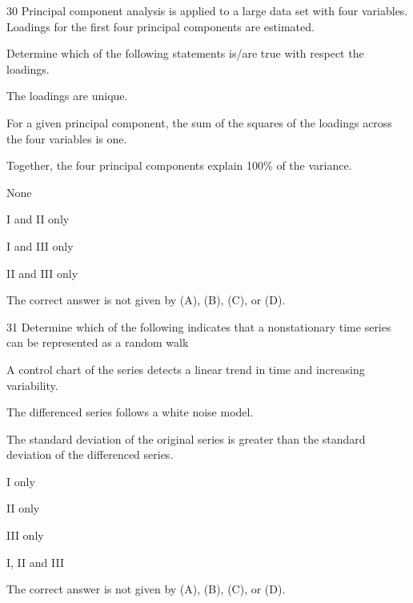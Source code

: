 \begin{question}{30}
Principal component analysis is applied to a large data set with four variables. Loadings for the first four principal components are estimated.

Determine which of the following statements is/are true with respect the loadings.
\begin{statements}
\item The loadings are unique.
\item For a given principal component, the sum of the squares of the loadings across the four variables is one.
\item Together, the four principal components explain 100\% of the variance.
\end{statements}

\begin{choices}
\item None
\item I and II only
\item I and III only
\item II and III only
\item The correct answer is not given by (A), (B), (C), or (D).
\end{choices}
\end{question}
\begin{question}{31}
Determine which of the following indicates that a nonstationary time series can be represented as a random walk
\begin{statements}
\item A control chart of the series detects a linear trend in time and increasing variability.
\item The differenced series follows a white noise model.
\item The standard deviation of the original series is greater than the standard deviation of the differenced series.
\end{statements}

\begin{choices}
\item I only
\item II only
\item III only
\item I, II and III
\item The correct answer is not given by (A), (B), (C), or (D).
\end{choices}
\end{question}

